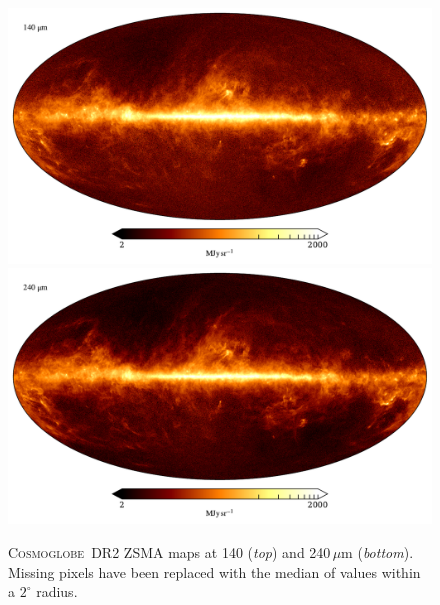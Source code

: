 \documentclass{aa}
\newcommand{\cosmoglobe}{\textsc{Cosmoglobe}}
\begin{document}
\begin{figure}
	\centering
	\includegraphics[width=0.96\linewidth]{figs/map_09.pdf}\\
	\includegraphics[width=0.96\linewidth]{figs/map_10.pdf}
	\caption{\cosmoglobe\ DR2 ZSMA maps at 140 (\emph{top}) and
          240$\,\mu$m (\emph{bottom}). Missing pixels have been replaced with
          the median of values within a $2^\circ$ radius.}
	\label{fig:freqmaps9_10}
\end{figure}
\end{document}
